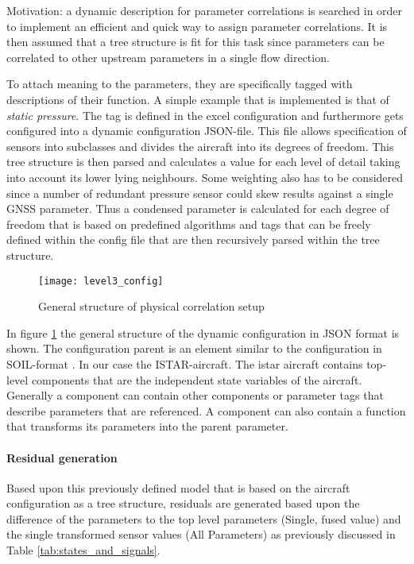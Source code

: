 Motivation: a dynamic description for parameter correlations is searched in order to implement an efficient and quick way to assign parameter correlations. It is then assumed that a tree structure is fit for this task since parameters can be correlated to other upstream parameters in a single flow direction.


To attach meaning to the parameters, they are specifically tagged with descriptions of their function. A simple example that is implemented is that of \textit{static pressure}. The tag is defined in the excel configuration and furthermore gets configured into a dynamic configuration JSON-file. This file allows specification of sensors into subclasses and divides the aircraft into its degrees of freedom. This tree structure is then parsed and calculates a value for each level of detail taking into account its lower lying neighbours. Some weighting also has to be considered since a number of redundant pressure sensor could skew results against a single GNSS parameter. Thus a condensed parameter is calculated for each degree of freedom that is based on predefined algorithms and tags that can be freely defined within the config file that are then recursively parsed within the tree structure.

\begin{figure}
    \centering
    \texttt{[image: level3\_config]}
    \caption{General structure of physical correlation setup}
    \label{fig:level3_config}
\end{figure}


In figure \ref{fig:level3_config} the general structure of the dynamic configuration in JSON format is shown. The configuration parent is an element similar to the configuration in SOIL-format \cite{behrens_domain-specific_2021}. In our case the ISTAR-aircraft. The istar aircraft contains top-level components that are the independent state variables of the aircraft. Generally a component can contain other components or parameter tags that describe parameters that are referenced. A component can also contain a function that transforms its parameters into the parent parameter.

\paragraph{Residual generation}
Based upon this previously defined model that is based on the aircraft configuration as a tree structure, residuals are generated based upon the difference of the parameters to the top level parameters (Single, fused value) and the single transformed sensor values (All Parameters) as previously discussed in Table \ref{tab:states_and_signals}.



